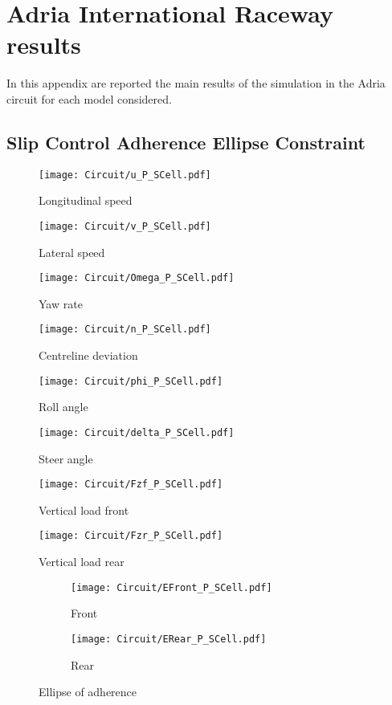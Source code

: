 \chapter{Adria International Raceway results}
\label{app:Adria}
%
In this appendix are reported the main results of the simulation in the Adria circuit for each model considered.
%
\section{Slip Control Adherence Ellipse Constraint}
%
\begin{figure}[!h]
    \centering
    \texttt{[image: Circuit/u\_P\_SCell.pdf]}
    \caption{Longitudinal speed}
    \label{fig:uSCE}
\end{figure}
%
\begin{figure}[!h]
    \centering
    \texttt{[image: Circuit/v\_P\_SCell.pdf]}
    \caption{Lateral speed}
    \label{fig:vSCE}
\end{figure}
%
\begin{figure}[!h]
    \centering
    \texttt{[image: Circuit/Omega\_P\_SCell.pdf]}
    \caption{Yaw rate}
    \label{fig:OmegaSCE}
\end{figure}
%
\begin{figure}[!h]
    \centering
    \texttt{[image: Circuit/n\_P\_SCell.pdf]}
    \caption{Centreline deviation}
    \label{fig:nSCE}
\end{figure}
%
\begin{figure}[!h]
    \centering
    \texttt{[image: Circuit/phi\_P\_SCell.pdf]}
    \caption{Roll angle}
    \label{fig:phiSCE}
\end{figure}
%
\begin{figure}[!h]
    \centering
    \texttt{[image: Circuit/delta\_P\_SCell.pdf]}
    \caption{Steer angle}
    \label{fig:deltaSCE}
\end{figure}
%
\begin{figure}[!h]
    \centering
    \texttt{[image: Circuit/Fzf\_P\_SCell.pdf]}
    \caption{Vertical load front}
    \label{fig:FZFSCE}
\end{figure}
%
\begin{figure}[!h]
    \centering
    \texttt{[image: Circuit/Fzr\_P\_SCell.pdf]}
    \caption{Vertical load rear}
    \label{fig:FZFSCE}
\end{figure}
%
\begin{figure}[!h]
    \begin{subfigure}{0.5\linewidth}
        \texttt{[image: Circuit/EFront\_P\_SCell.pdf]}
        \caption{Front}
        \label{fig:FESCE}
    \end{subfigure}%
    \begin{subfigure}{0.5\linewidth}
        \texttt{[image: Circuit/ERear\_P\_SCell.pdf]}
        \caption{Rear}
        \label{fig:RESCE}
    \end{subfigure}
    \caption{Ellipse of adherence}
\end{figure}
